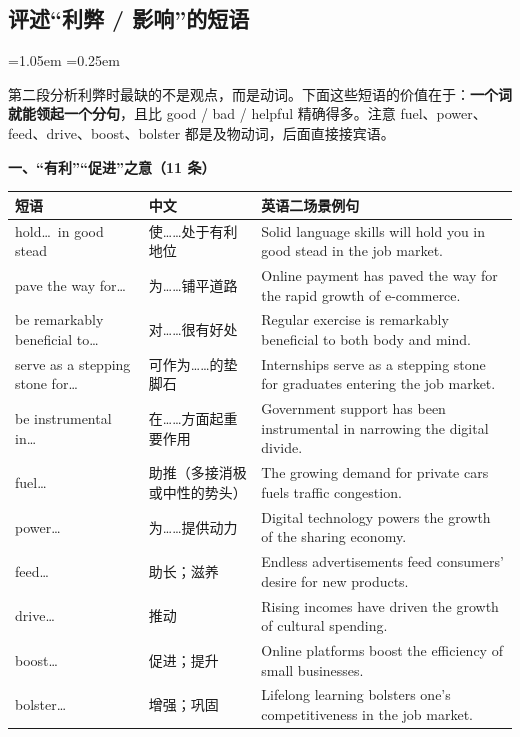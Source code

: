 \documentclass[11pt,a4paper]{ctexart}
\newenvironment{note}{%
  \par\addvspace{5pt}%
  \begin{list}{}{\leftmargin=1.05em \rightmargin=0.25em \listparindent=0pt
    \itemindent=0pt \topsep=0pt \parsep=2pt \itemsep=2pt \partopsep=0pt}%
  \item\relax\small\color{ink}%
}{%
  \end{list}\addvspace{5pt}%
}
\begin{document}
\subsection{评述“利弊 / 影响”的短语}

\begin{note}
第二段分析利弊时最缺的不是观点，而是动词。下面这些短语的价值在于：\textbf{一个词就能领起一个分句}，且比 good / bad / helpful 精确得多。注意 fuel、power、feed、drive、boost、bolster 都是及物动词，后面直接接宾语。
\end{note}

\par\addvspace{5pt}\noindent\textbf{一、“有利”“促进”之意（11 条）}\par\addvspace{2pt}
\begin{longtable}{L{4.8cm}L{2.8cm}L{7.8cm}}
\toprule
\textbf{短语} & \textbf{中文} & \textbf{英语二场景例句} \\
\midrule
\endhead
hold\ldots\ in good stead & 使……处于有利地位 & Solid language skills will hold you in good stead in the job market. \\
pave the way for\ldots & 为……铺平道路 & Online payment has paved the way for the rapid growth of e-commerce. \\
be remarkably beneficial to\ldots & 对……很有好处 & Regular exercise is remarkably beneficial to both body and mind. \\
serve as a stepping stone for\ldots & 可作为……的垫脚石 & Internships serve as a stepping stone for graduates entering the job market. \\
be instrumental in\ldots & 在……方面起重要作用 & Government support has been instrumental in narrowing the digital divide. \\
fuel\ldots & 助推（多接消极或中性的势头） & The growing demand for private cars fuels traffic congestion. \\
power\ldots & 为……提供动力 & Digital technology powers the growth of the sharing economy. \\
feed\ldots & 助长；滋养 & Endless advertisements feed consumers' desire for new products. \\
drive\ldots & 推动 & Rising incomes have driven the growth of cultural spending. \\
boost\ldots & 促进；提升 & Online platforms boost the efficiency of small businesses. \\
bolster\ldots & 增强；巩固 & Lifelong learning bolsters one's competitiveness in the job market. \\
\bottomrule
\end{longtable}
\end{document}
